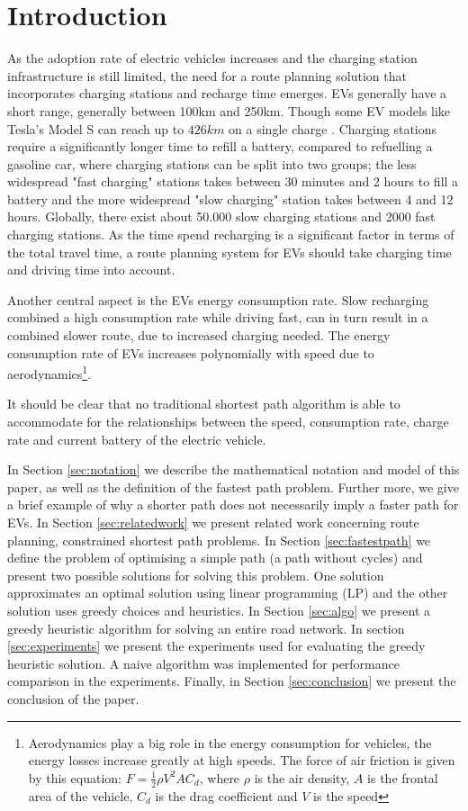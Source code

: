 \section{Introduction}

As the adoption rate of electric vehicles increases \cite{Henry2013} and the charging station infrastructure is still limited, the need for a route planning solution that incorporates charging stations and recharge time emerges. EVs generally have a short range, generally between 100km and 250km. Though some EV models like Tesla's Model S can reach up to $426\si{km}$ on a single charge \cite{teslacon}. Charging stations require a significantly longer time to refill a battery, compared to refuelling a gasoline car, where charging stations can be split into two groups; the less widespread "fast charging" stations takes between 30 minutes and 2 hours to fill a battery and the more widespread "slow charging" station takes between 4 and 12 hours. Globally, there exist about 50.000 slow charging stations and 2000 fast charging stations\cite{Globalevoutlook}. As the time spend recharging is a significant factor in terms of the total travel time, a route planning system for EVs should take charging time and driving time into account.

Another central aspect is the EVs energy consumption rate. Slow recharging combined a high consumption rate while driving fast, can in turn result in a combined slower route, due to increased charging needed. The energy consumption rate of EVs increases polynomially with speed due to aerodynamics\footnote{Aerodynamics play a big role in the energy consumption for vehicles, the energy losses increase greatly at high speeds. The force of air friction is given by this equation: $F = \frac{1}{2} \rho V^2 A C_d$, where $\rho$ is the air density, $A$ is the frontal area of the vehicle, $C_d$ is the drag coefficient and $V$ is the speed}.

It should be clear that no traditional shortest path algorithm is able to accommodate for the relationships between the speed, consumption rate, charge rate and current battery of the electric vehicle. 

In Section \ref{sec:notation} we describe the mathematical notation and model of this paper, as well as the definition of the fastest path problem. Further more, we give a brief example of why a shorter path does not necessarily imply a faster path for EVs. In Section \ref{sec:relatedwork} we present related work concerning route planning, constrained shortest path problems. In Section \ref{sec:fastestpath} we define the problem of optimising a simple path (a path without cycles) and present two possible solutions for solving this problem. One solution approximates an optimal solution using linear programming (LP) and the other solution uses greedy choices and heuristics. In Section \ref{sec:algo} we present a greedy heuristic algorithm for solving an entire road network. In section \ref{sec:experiments} we present the experiments used for evaluating the greedy heuristic solution. A naive algorithm was implemented for performance comparison in the experiments. Finally, in Section \ref{sec:conclusion} we present the conclusion of the paper.    